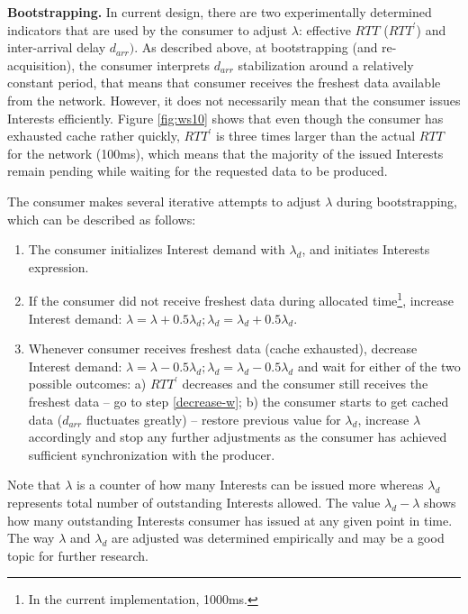 \documentclass{icn/sig-alternate-2013} %
\newcommand{\wConcept}{Interest demand}
\begin{document}
\textbf{Bootstrapping.} In current design, there are two experimentally determined indicators that are used by the consumer to adjust $\lambda$: effective $RTT$ ($RTT^\prime$) and inter-arrival delay $d_{arr})$. As described above, at bootstrapping (and re-acquisition), the consumer interprets $d_{arr}$ stabilization around a relatively constant period, that means that consumer receives the freshest data available from the network. However, it does not necessarily mean that the consumer issues Interests efficiently. Figure \ref{fig:ws10} shows that even though the consumer has exhausted cache rather quickly, $RTT^\prime$ is three times larger than the actual $RTT$ for the network (100ms), which means that the majority of the issued Interests remain pending while waiting for the requested data to be produced.

The consumer makes several iterative attempts to adjust $\lambda$ during bootstrapping, which can be described as follows:
\begin{enumerate}
\item The consumer initializes \wConcept{} with $\lambda_d$, and initiates Interests expression.
\item If the consumer did not receive freshest data during allocated time\footnote{In the current implementation, 1000ms.}, increase \wConcept{}: $\lambda=\lambda+0.5\lambda_d; \lambda_d = \lambda_d+0.5\lambda_d$.
\item \label{decrease-w} Whenever consumer receives freshest data (cache exhausted), decrease \wConcept{}: $\lambda=\lambda-0.5\lambda_d; \lambda_d = \lambda_d-0.5\lambda_d$ and wait for either of the two possible outcomes:
a) $RTT^\prime$ decreases and the consumer still receives the freshest data -- go to step \ref{decrease-w};
b) the consumer starts to get cached data ($d_{arr}$ fluctuates greatly) -- restore previous value for $\lambda_d$, increase $\lambda$ accordingly and stop any further adjustments as the consumer has achieved sufficient synchronization with the producer.
\end{enumerate}

Note that $\lambda$ is a counter of how many Interests can be issued more whereas $\lambda_d$ represents total number of outstanding Interests allowed. The value $\lambda_d-\lambda$ shows how many outstanding Interests consumer has issued at any given point in time. The way $\lambda$ and $\lambda_d$ are adjusted was determined empirically and may be a good topic for further research.
\end{document}
